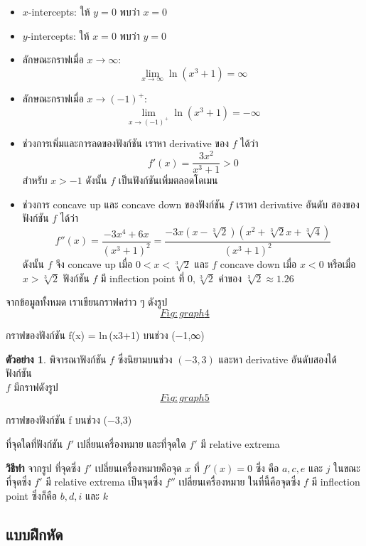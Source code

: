 \documentclass[
]{book}
\theoremstyle{definition}
\theoremstyle{definition}
\newtheorem{example}{ตัวอย่าง}[chapter]
\theoremstyle{definition}
\theoremstyle{definition}
\theoremstyle{remark}
\begin{document}
\begin{itemize}
\item
  \(x\)-intercepts: ให้ \(y=0\) พบว่า \(x=0\)
\item
  \(y\)-intercepts: ให้ \(x=0\) พบว่า \(y=0\)
\item
  ลักษณะกราฟเมื่อ \(x \to \infty\):
  \[\lim_{x\to\infty} \ln(x^3+1) = \infty\]
\item
  ลักษณะกราฟเมื่อ \(x\to (-1)^+\):
  \[\lim_{x\to (-1)^+} \ln(x^3+1) = -\infty\]
\item
  ช่วงการเพิ่มและการลดของฟังก์ชัน เราหา derivative ของ \(f\) ได้ว่า
  \[f'(x) = \frac{3x^2}{x^3+1} > 0\] สำหรับ \(x>-1\) ดังนั้น \(f\)
  เป็นฟังก์ชันเพิ่มตลอดโดเมน
\item
  ช่วงการ concave up และ concave down ของฟังก์ชัน \(f\) เราหา derivative
  อันดับ สองของฟังก์ชัน \(f\) ได้ว่า
  \[f''(x) = \frac{-3x^4+6x}{(x^3+1)^2} = \frac{-3x(x-\sqrt[3]{2})(x^2+\sqrt[3]{2}x+\sqrt[3]{4})}{(x^3+1)^2}\]
  ดังนั้น \(f\) จึง concave up เมื่อ \(0<x<\sqrt[3]{2}\) และ \(f\) concave down
  เมื่อ \(x<0\) หรือเมื่อ \(x>\sqrt[3]{2}\) ฟังก์ชัน \(f\) มี inflection point ที่
  \(0,\sqrt[3]{2}\) ค่าของ \(\sqrt[3]{2} \approx 1.26\)
\end{itemize}

จากข้อมูลทั้งหมด เราเขียนกราฟคร่าว ๆ
ดังรูป~\hyperref[Fig:graph4]{\[Fig:graph4\]}

กราฟของฟังก์ชัน {f(x) = ln (x3+1)}
บนช่วง {(−1,∞)}

\begin{example}
พิจารณาฟังก์ชัน \(f\) ซึ่งนิยามบนช่วง \((-3,3)\) และหา derivative อันดับสองได้ ฟังก์ชัน\\
\(f\) มีกราฟดังรูป~\hyperref[Fig:graph5]{\[Fig:graph5\]}

กราฟของฟังก์ชัน {f}
บนช่วง {(−3,3)}

ที่จุดใดที่ฟังก์ชัน \(f'\) เปลี่ยนเครื่องหมาย และที่จุดใด \(f'\) มี relative extrema
\end{example}

\textbf{วิธีทำ} จากรูป ที่จุดซึ่ง \(f'\) เปลี่ยนเครื่องหมายคือจุด \(x\) ที่ \(f'(x) = 0\) ซึ่ง คือ
\(a, c, e\) และ \(j\) ในขณะที่จุดซึ่ง \(f'\) มี relative extrema เป็นจุดซึ่ง \(f''\)
เปลี่ยนเครื่องหมาย ในที่นี้คือจุดซึ่ง \(f\) มี inflection point ซึ่งก็คือ \(b, d, i\) และ \(k\)

\subsection{แบบฝึกหัด}\label{uxe41uxe1auxe1auxe1duxe01uxe2buxe14-4}
\end{document}
